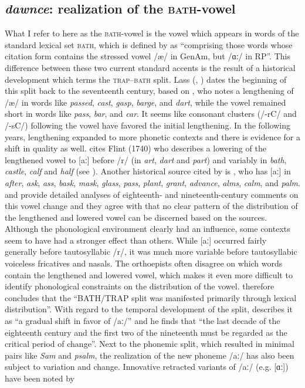 \subsection{\emph{dawnce}: realization of the \textsc{bath}{}-vowel}
\label{subsection334}
\hypertarget{Toc63021225}{}
What I refer to here as the \textsc{bath}{}-vowel is the vowel which appears in words of the standard lexical set \textsc{bath}, which is defined by \citet[133]{Wells1982} as “comprising those words whose citation form contains the stressed vowel /æ/ in GenAm, but /ɑː/ in RP”. This difference between these two current standard accents is the result of a historical development which \citet[134]{Wells1982} terms the \textsc{trap–bath} split. Lass (\citeyear[103--108]{Lass1999b}, \citeyear[89--90]{Lass2006}) dates the beginning of this split back to the seventeenth century, based on \citet{Cooper1687}, who notes a lengthening of /æ/ in words like \emph{passed}, \emph{cast}, \emph{gasp}, \emph{barge}, and \emph{dart}, while the vowel remained short in words like \emph{pass}, \emph{bar}, and \emph{car}. It seems like consonant clusters (/-rC/ and /-sC/) following the vowel have favored the initial lengthening. In the following years, lengthening expanded to more phonetic contexts and there is evidence for a shift in quality as well. \citet[106]{Lass1999b} cites Flint (1740) who describes a lowering of the lengthened vowel to [aː] before /r/ (in \emph{art}, \emph{dart} and \emph{part}) and variably in \emph{bath}, \emph{castle}, \emph{calf} and \emph{half} (see \citealt{Kokeritz1944}). Another historical source cited by \citet[106]{Lass1999b} is \citet{Nares1784}, who has [aː] in \emph{after}, \emph{ask}, \emph{ass}, \emph{bask}, \emph{mask}, \emph{glass}, \emph{pass}, \emph{plant}, \emph{grant}, \emph{advance}, \emph{alms}, \emph{calm}, and \emph{palm}. \citet{Jones2006} and \citet{MacMahon1998} provide detailed analyses of eighteenth- and nineteenth-century comments on this vowel change and they agree with \citet{Lass1999b, Lass2006} that no clear pattern of the distribution of the lengthened and lowered vowel can be discerned based on the sources. Although the phonological environment clearly had an influence, some contexts seem to have had a stronger effect than others. While [aː] occurred fairly generally before tautosyllabic /r/, it was much more variable before tautosyllabic voiceless fricatives and nasals. The orthoepists often disagree on which words contain the lengthened and lowered vowel, which makes it even more difficult to identify phonological constraints on the distribution of the vowel. \citet[198]{Jones2006} therefore concludes that the “BATH/TRAP split was manifested primarily through lexical distribution”. With regard to the temporal development of the split, \citet[436-437]{MacMahon1998} describes it as “a gradual shift in favor of /aː/” and he finds that “the last decade of the eighteenth century and the first two of the nineteenth must be regarded as the critical period of change”. Next to the phonemic split, which resulted in minimal pairs like \emph{Sam} and \emph{psalm}, the realization of the new phoneme /aː/ has also been subject to variation and change. Innovative retracted variants of /aː/ (e.g. [ɑː]) have been noted by 